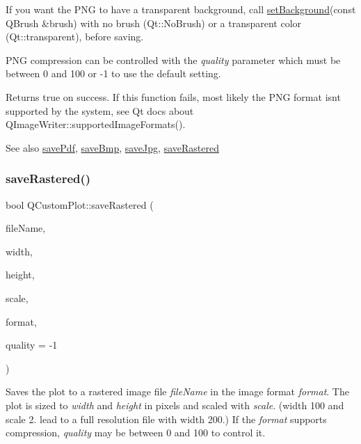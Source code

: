 If you want the P\+NG to have a transparent background, call \mbox{\hyperlink{class_q_custom_plot_a130358592cfca353ff3cf5571b49fb00}{set\+Background}}(const Q\+Brush \&brush) with no brush (Qt\+::\+No\+Brush) or a transparent color (Qt\+::transparent), before saving.

P\+NG compression can be controlled with the {\itshape quality} parameter which must be between 0 and 100 or -\/1 to use the default setting.

Returns true on success. If this function fails, most likely the P\+NG format isn\textquotesingle{}t supported by the system, see Qt docs about Q\+Image\+Writer\+::supported\+Image\+Formats().

\begin{DoxySeeAlso}{See also}
\mbox{\hyperlink{class_q_custom_plot_a632da44c6d94ea8b271eb483b08b5114}{save\+Pdf}}, \mbox{\hyperlink{class_q_custom_plot_a6629d9e8e6da4bf18055ee0257fdce9a}{save\+Bmp}}, \mbox{\hyperlink{class_q_custom_plot_a490c722092d1771e8ce4a7a73dfd84ab}{save\+Jpg}}, \mbox{\hyperlink{class_q_custom_plot_ab528b84cf92baabe29b1d0ef2f77c93e}{save\+Rastered}} 
\end{DoxySeeAlso}
\mbox{\label{class_q_custom_plot_ab528b84cf92baabe29b1d0ef2f77c93e}} 
\subsubsection{\texorpdfstring{save\+Rastered()}{saveRastered()}}
{\footnotesize\ttfamily bool Q\+Custom\+Plot\+::save\+Rastered (\begin{DoxyParamCaption}\item[{const Q\+String \&}]{file\+Name,  }\item[{int}]{width,  }\item[{int}]{height,  }\item[{double}]{scale,  }\item[{const char $\ast$}]{format,  }\item[{int}]{quality = {\ttfamily -\/1} }\end{DoxyParamCaption})}

Saves the plot to a rastered image file {\itshape file\+Name} in the image format {\itshape format}. The plot is sized to {\itshape width} and {\itshape height} in pixels and scaled with {\itshape scale}. (width 100 and scale 2. lead to a full resolution file with width 200.) If the {\itshape format} supports compression, {\itshape quality} may be between 0 and 100 to control it.

